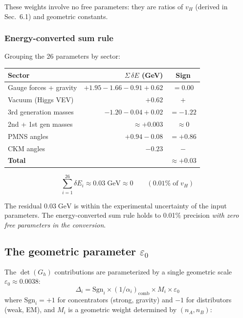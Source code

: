 These weights involve no free parameters: they are ratios of $v_H$ (derived in Sec.~6.1) and geometric constants.

\subsubsection{Energy-converted sum rule}

Grouping the 26 parameters by sector:

\begin{center}
\begin{tabular}{lrc}
\hline
Sector & $\Sigma\,\delta E$ (GeV) & Sign \\
\hline
Gauge forces + gravity & $+1.95 - 1.66 - 0.91 + 0.62$ & $= 0.00$ \\
Vacuum (Higgs VEV) & $+0.62$ & $+$ \\
3rd generation masses & $-1.20 - 0.04 + 0.02$ & $= -1.22$ \\
2nd + 1st gen masses & $\approx +0.003$ & $\approx 0$ \\
PMNS angles & $+0.94 - 0.08$ & $= +0.86$ \\
CKM angles & $-0.23$ & $-$ \\
\hline
\textbf{Total} & & $\approx \mathbf{+0.03}$ \\
\hline
\end{tabular}
\end{center}

\begin{equation}
\boxed{\sum_{i=1}^{26} \delta E_i \approx 0.03\;\text{GeV} \approx 0 \qquad (0.01\%\;\text{of } v_H)}
\end{equation}

The residual $0.03\;\text{GeV}$ is within the experimental uncertainty of the input parameters. The energy-converted sum rule holds to 0.01\% precision \emph{with zero free parameters in the conversion}.

\subsection{The geometric parameter $\varepsilon_0$}

The $\det(G_h)$ contributions are parameterized by a single geometric scale $\varepsilon_0 \approx 0.0038$:
\begin{equation}
\Delta_i = \text{Sgn}_i \times (1/\alpha_i)_\text{comb} \times M_i \times \varepsilon_0
\end{equation}
where $\text{Sgn}_i = +1$ for concentrators (strong, gravity) and $-1$ for distributors (weak, EM), and $M_i$ is a geometric weight determined by $(n_A, n_B)$:

